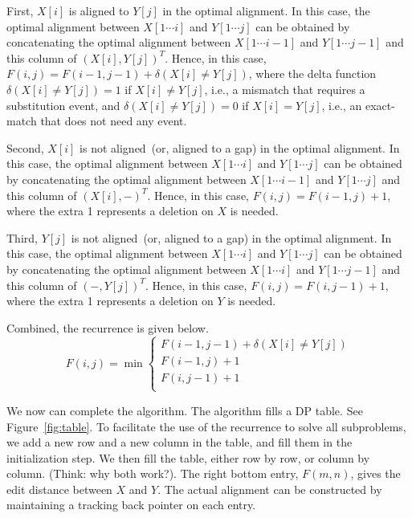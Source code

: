 First, $X[i]$ is aligned to $Y[j]$ in the optimal alignment. In this case, the optimal alignment
between $X[1\cdots i]$ and $Y[1\cdots j]$ can be obtained by concatenating the optimal alignment
between $X[1\cdots i-1]$ and $Y[1\cdots j-1]$ and this column of $(X[i], Y[j])^T$.
Hence, in this case, $F(i,j) = F(i-1, j-1) + \delta(X[i] \neq Y[j])$, where the delta function
$\delta(X[i] \neq Y[j]) = 1$ if $X[i] \neq Y[j]$, i.e., a mismatch that requires a substitution event,
and $\delta(X[i] \neq Y[j]) = 0$ if $X[i] = Y[j]$, i.e., an exact-match that does not need any event.

Second, $X[i]$ is not aligned~(or, aligned to a gap) in the optimal alignment. In this case, the optimal alignment
between $X[1\cdots i]$ and $Y[1\cdots j]$ can be obtained by concatenating the optimal alignment
between $X[1\cdots i-1]$ and $Y[1\cdots j]$ and this column of $(X[i], -)^T$.
Hence, in this case, $F(i,j) = F(i-1, j) + 1$, where 
the extra 1 represents a deletion on $X$ is needed.

Third, $Y[j]$ is not aligned~(or, aligned to a gap) in the optimal alignment. In this case, the optimal alignment
between $X[1\cdots i]$ and $Y[1\cdots j]$ can be obtained by concatenating the optimal alignment
between $X[1\cdots i]$ and $Y[1\cdots j-1]$ and this column of $(-, Y[j])^T$.
Hence, in this case, $F(i,j) = F(i, j- 1) + 1$, where 
the extra 1 represents a deletion on $Y$ is needed.

Combined, the recurrence is given below.
\begin{displaymath}
F(i,j) = \min\left\{
	\begin{array}{llll}
	F(i-1,j-1) + \delta(X[i] \neq Y[j]) \\
	F(i-1,j) + 1 \\
	F(i,j-1) + 1 \\
	\end{array}
\right.
\end{displaymath}

We now can complete the algorithm. The algorithm fills a DP table. See Figure~\ref{fig:table}.
To facilitate the use of the recurrence to solve all subproblems, we add a new row and a new column in the table,
and fill them in the initialization step. 
We then fill the table, either row by row, or column by column. (Think: why both work?).
The right bottom entry, $F(m, n)$, gives the edit distance between $X$ and $Y$.
The actual alignment can be constructed by maintaining a tracking back pointer on each entry.

